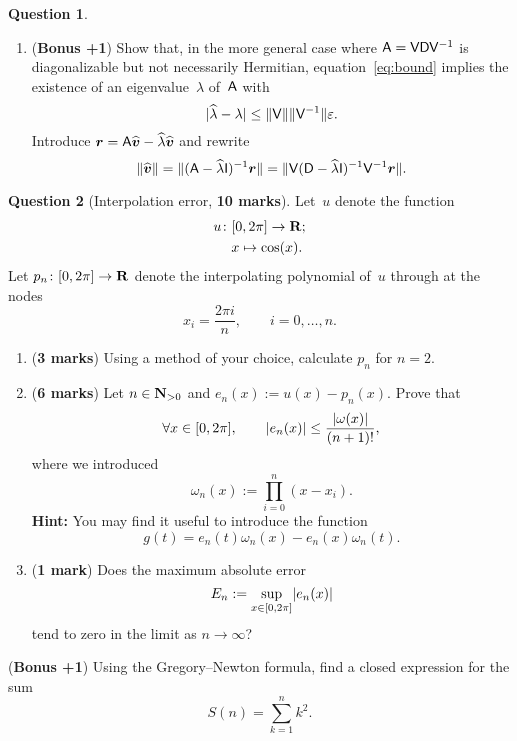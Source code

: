 \documentclass[11pt]{article}
\theoremstyle{definition}
\newtheorem{question}{Question}
\begin{document}
\begin{question}
\begin{enumerate}
        \item
            (\textbf{Bonus +1}) Show that, in the more general case where $\mathsf A = \mathsf V \mathsf D \mathsf V^{-1}$ is diagonalizable but not necessarily Hermitian,
            equation~\eqref{eq:bound} implies the existence of an eigenvalue~$\lambda$ of~$\mathsf A$ with
            \[
                \lvert\widehat \lambda - \lambda\rvert \leq \lVert\mathsf V\rVert \lVert\mathsf V^{-1}\rVert \varepsilon.
            \]
            Introduce $\mathbf{\boldsymbol{r}} = \mathsf A \widehat{\mathbf{\boldsymbol{v}}} - \widehat{\lambda} \widehat{\mathbf{\boldsymbol{v}}}$ and rewrite
            \[
                \lVert\widehat {\mathbf{\boldsymbol{v}}}\rVert = \lVert(\mathsf A - \widehat \lambda \mathsf I)^{-1}  {\mathbf{\boldsymbol{r}}}\rVert
                = \lVert\mathsf V (\mathsf D - \widehat \lambda \mathsf I)^{-1}  \mathsf V^{-1} {\mathbf{\boldsymbol{r}}}\rVert.
            \]
    \end{enumerate}
\end{question}

\newpage
\begin{question}
    [Interpolation error, \textbf{10 marks}]
    Let~$u$ denote the function
    \begin{align*}
        u\colon
        &[0, 2\pi] \to \mathbf R; \\
        &x \mapsto \cos(x).
    \end{align*}
    Let $p_n \colon [0, 2 \pi] \to \mathbf R$ denote the interpolating polynomial of~$u$ through at the nodes
    \[
        x_i = \frac{2 \pi i}{n}, \qquad i = 0, \dotsc, n.
    \]
    \begin{enumerate}
        \item
            (\textbf{3 marks})
            Using a method of your choice,
            calculate $p_n$ for $n = 2$.

        \item
            (\textbf{6 marks})
            Let $n \in \mathbf N_{>0}$ and $e_n(x) := u(x) - p_n(x)$.
            Prove that
            \[
                \forall x \in [0, 2\pi], \qquad
                \lvert e_n(x)\rvert
                \leq \frac{\lvert \omega(x) \rvert}{(n+1)!},
            \]
            where we introduced
            \[
                \omega_n(x) := \prod_{i=0}^{n} (x - x_i).
            \]
            \textbf{Hint:} You may find it useful to introduce the function
            \[
                g(t) = e_n(t) \omega_n(x) - e_n(x) \omega_n(t).
            \]

        \item
            (\textbf{1 mark}) Does the maximum absolute error
            \[
                E_n := \sup_{x \in [0, 2\pi]} \lvert e_n(x)\rvert
            \]
            tend to zero in the limit as $n \to \infty$?
    \end{enumerate}

    \noindent (\textbf{Bonus +1}) Using the Gregory--Newton formula,
    find a closed expression for the sum
    \[
        S(n) = \sum_{k=1}^{n} k^2.
    \]
\end{question}
\end{document}
